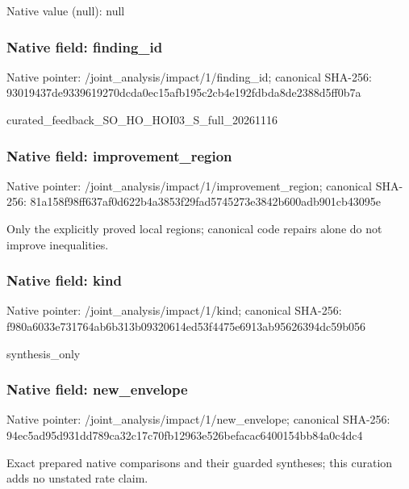 \documentclass[10pt,a4paper]{article}
\begin{document}
Native value (null): null

\subsubsection{Native field: finding\_\allowbreak{}id}
Native pointer: /joint\_\allowbreak{}analysis/impact/1/finding\_\allowbreak{}id; canonical SHA-256: 93019437de9339619270dcda0ec15afb195c2cb4e192fdbda8de2388d5ff0b7a

\begingroup\raggedright\sloppy curated\_\allowbreak{}feedback\_\allowbreak{}SO\_\allowbreak{}HO\_\allowbreak{}HOI03\_\allowbreak{}S\_\allowbreak{}full\_\allowbreak{}20261116\par\endgroup

\subsubsection{Native field: improvement\_\allowbreak{}region}
Native pointer: /joint\_\allowbreak{}analysis/impact/1/improvement\_\allowbreak{}region; canonical SHA-256: 81a158f98ff637af0d622b4a3853f29fad5745273e3842b600adb901cb43095e

\begingroup\raggedright\sloppy Only the explicitly proved local regions;\allowbreak{} canonical code repairs alone do not improve inequalities.\par\endgroup

\subsubsection{Native field: kind}
Native pointer: /joint\_\allowbreak{}analysis/impact/1/kind; canonical SHA-256: f980a6033e731764ab6b313b09320614ed53f4475e6913ab95626394dc59b056

\begingroup\raggedright\sloppy synthesis\_\allowbreak{}only\par\endgroup

\subsubsection{Native field: new\_\allowbreak{}envelope}
Native pointer: /joint\_\allowbreak{}analysis/impact/1/new\_\allowbreak{}envelope; canonical SHA-256: 94ec5ad95d931dd789ca32c17c70fb12963e526befacac6400154bb84a0c4dc4

\begingroup\raggedright\sloppy Exact prepared native comparisons and their guarded syntheses;\allowbreak{} this curation adds no unstated rate claim.\par\endgroup
\end{document}

